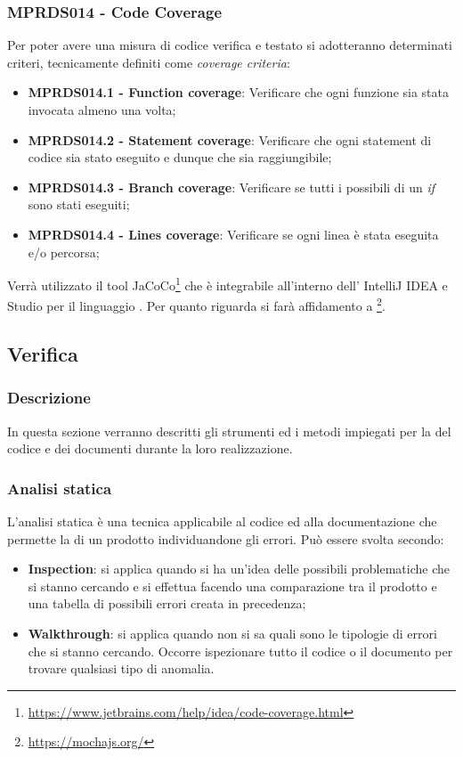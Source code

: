 \subsubsection{MPRDS014 - Code Coverage}
Per poter avere una misura di codice verifica e testato si adotteranno determinati criteri, tecnicamente definiti come \textit{coverage criteria}:
\begin{itemize}
    \item \textbf{MPRDS014.1 - Function coverage}: Verificare che ogni funzione sia stata invocata almeno una volta;
    \item \textbf{MPRDS014.2 - Statement coverage}: Verificare che ogni statement di codice sia stato eseguito e dunque che sia raggiungibile;
    \item \textbf{MPRDS014.3 - Branch coverage}: Verificare se tutti i possibili  di un \textit{if} sono stati eseguiti;
    \item \textbf{MPRDS014.4 - Lines coverage}: Verificare se ogni linea è stata eseguita e/o percorsa;
\end{itemize}
Verrà utilizzato il tool JaCoCo\footnote{\href{https://www.jetbrains.com/help/idea/code-coverage.html}{https://www.jetbrains.com/help/idea/code-coverage.html}} che è integrabile all'interno dell' IntelliJ IDEA e  Studio per il linguaggio . Per quanto riguarda  si farà affidamento a \footnote{\href{https://mochajs.org/}{https://mochajs.org/}}.

\subsection{Verifica}
\label{sec:verifica}
\subsubsection{Descrizione}
In questa sezione verranno descritti gli strumenti ed i metodi impiegati per la  del codice e dei documenti durante la loro realizzazione.
\subsubsection{Analisi statica}
L’analisi statica è una tecnica applicabile al codice ed alla documentazione che permette la  di un prodotto individuandone gli errori. Può essere svolta secondo:
\begin{itemize}
    \item \textbf{Inspection}: si applica quando si ha un’idea delle possibili problematiche che si stanno cercando e si effettua facendo una comparazione tra il prodotto e una tabella di possibili errori creata in precedenza;
    \item \textbf{Walkthrough}: si applica quando non si sa quali sono le tipologie di errori che si stanno cercando. Occorre ispezionare tutto il codice o il documento per trovare qualsiasi tipo di anomalia.
\end{itemize}
